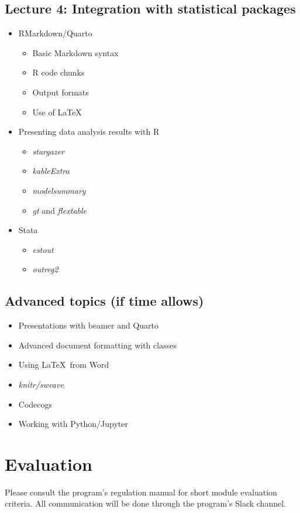 \documentclass[a4paper,11pt]{article}
\begin{document}
\subsection{Lecture 4: Integration with statistical packages}

\begin{itemize}
    \item RMarkdown/Quarto
    \begin{itemize}
        \item Basic Markdown syntax
        \item R code chunks
        \item Output formats
        \item Use of \LaTeX
    \end{itemize}
    \item Presenting data analysis results with R
    \begin{itemize}
        \item \textit{stargazer}
        \item \textit{kableExtra}
        \item \textit{modelsummary}
        \item \textit{gt} and \textit{flextable}
    \end{itemize}
    \item Stata
    \begin{itemize}
        \item \textit{estout}
        \item \textit{outreg2}
    \end{itemize}
\end{itemize}

\subsection{Advanced topics (if time allows)}

\begin{itemize}
    \item Presentations with beamer and Quarto
    \item Advanced document formatting with classes
    \item Using \LaTeX \ from Word
    \item \textit{knitr/sweave}
    \item Codecogs
    \item Working with Python/Jupyter
\end{itemize}

\section{Evaluation}

Please consult the program's regulation manual for short module evaluation criteria. All communication will be done through the program's Slack channel. 

\renewcommand\bibname{Reference Material}
\printbibliography
\end{document}
